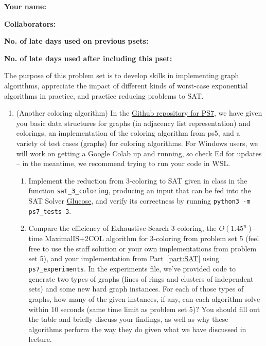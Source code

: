 \documentclass[11pt]{article}
\begin{document}

\textbf{Your name: }

\textbf{Collaborators: }

\textbf{No. of late days used on previous psets: }

\textbf{No. of late days used after including this pset: }


The purpose of this problem set is to develop skills in implementing graph algorithms, appreciate the impact of different kinds of worst-case exponential algorithms in practice, and practice reducing problems to SAT.
\begin{enumerate}

    \item (Another coloring algorithm) 
  In the \href{https://github.com/Harvard-CS-1200/cs1200/tree/main/fall2024/psets/ps7}{Github repository for PS7}, we have given you basic data structures for graphs (in adjacency list representation) and colorings, an implementation of the coloring algorithm from ps5, and a variety of test cases (graphs) for coloring algorithms. For Windows users, we will work on getting a Google Colab up and running, so check Ed for updates -- in the meantime, we recommend trying to run your code in WSL.
  
  \begin{enumerate}
      
      \item Implement the reduction from 3-coloring to SAT given in class in the function \texttt{sat\_3\_coloring}, producing an input that can be fed into the SAT Solver \href{https://pysathq.github.io/usage/}{Glucose}, and verify its correctness by running \texttt{python3 -m ps7\_tests 3}. \label{part:SAT}

     
      \item Compare the efficiency of Exhaustive-Search 3-coloring, the $O(1.45^n)$-time MaximalIS+2COL algorithm for 3-coloring from problem set 5 (feel free to use the staff solution or your own implementations from problem set 5), and your implementation from  Part~\ref{part:SAT} using \texttt{ps7\_experiments}. In the experiments file, we've provided code to generate two types of graphs (lines of rings and clusters of independent sets) and some new hard graph instances. For each of those types of graphs, how many of the given instances, if any, can each algorithm solve within 10 seconds (same time limit as problem set 5)? You should fill out the table and briefly discuss your findings, as well as why these algorithms perform the way they do given what we have discussed in lecture.


\end{enumerate}
\end{enumerate}
\end{document}
